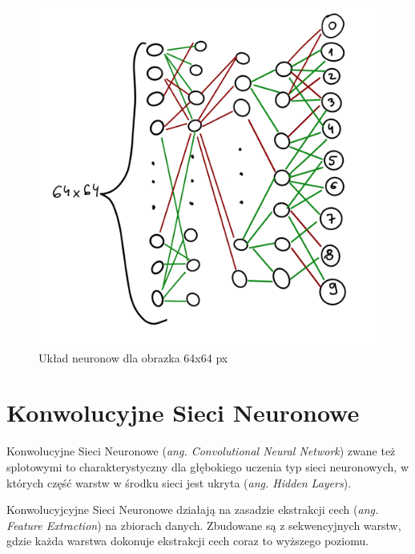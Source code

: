 \documentclass[brudnopis]{xmgr}
\begin{document}
\begin{figure}[!tbh]
\centering
\includegraphics[width=.8\hsize]{fig/2}
\caption{Układ neuronow dla obrazka 64x64 px\label{RYS.2}}
\end{figure}


\section{Konwolucyjne Sieci Neuronowe  \label{s:dsssl}}


Konwolucyjne Sieci Neuronowe (\textit{ang. Convolutional Neural Network}) zwane też splotowymi to charakterystyczny dla głębokiego uczenia typ sieci neuronowych, w których część warstw w środku sieci jest ukryta (\textit{ang. Hidden Layers}).

Konwolucyjcyjne Sieci Neuronowe działają na zasadzie ekstrakcji cech (\textit{ang. Feature Extraction}) na zbiorach danych. Zbudowane są z sekwencyjnych warstw, gdzie każda warstwa dokonuje ekstrakcji cech coraz to wyższego poziomu.
\end{document}
